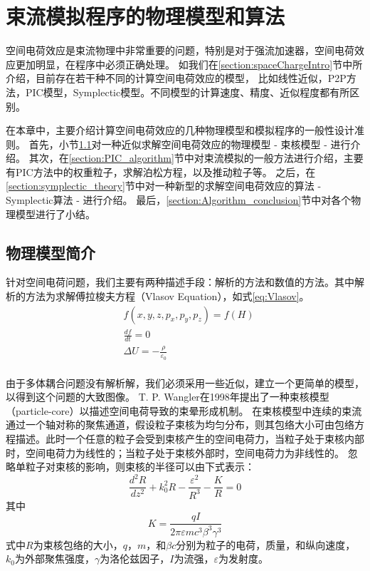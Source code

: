 
\chapter{束流模拟程序的物理模型和算法}
\label{chap:Algorithm}
空间电荷效应是束流物理中非常重要的问题，特别是对于强流加速器，空间电荷效应更加明显，在程序中必须正确处理。
如我们在\ref{section:spaceChargeIntro}节中所介绍，目前存在若干种不同的计算空间电荷效应的模型，
比如线性近似，P2P方法，PIC模型，Symplectic模型。不同模型的计算速度、精度、近似程度都有所区别。

在本章中，主要介绍计算空间电荷效应的几种物理模型和模拟程序的一般性设计准则。
首先，小节\ref{section:particle_core}对一种近似求解空间电荷效应的物理模型 - 束核模型 - 进行介绍。
其次，在\ref{section:PIC_algorithm}节中对束流模拟的一般方法进行介绍，主要有PIC方法中的权重粒子，求解泊松方程，以及推动粒子等。
之后，在\ref{section:symplectic_theory}节中对一种新型的求解空间电荷效应的算法 - Symplectic算法 - 进行介绍。
最后，\ref{section:Algorithm_conclusion}节中对各个物理模型进行了小结。

\section{物理模型简介}            \label{section:particle_core}
针对空间电荷问题，我们主要有两种描述手段：解析的方法和数值的方法。其中解析的方法为求解傅拉梭夫方程（Vlasov Equation），如式\ref{eq:Vlasov}。
\begin{equation}
    \label{eq:Vlasov}
    \begin{aligned}
        & f(x,y,z,{{p}_{x}},{{p}_{y}},{{p}_{z}})=f(H) \\
        & \frac{df}{dt}=0 \\
        & \Delta U=-\frac{\rho }{{{\varepsilon }_{0}}} \\
    \end{aligned}
\end{equation}

由于多体耦合问题没有解析解，我们必须采用一些近似，建立一个更简单的模型，以得到这个问题的大致图像。
T. P. Wangler在1998年提出了一种束核模型（particle-core）\cite{wangler1998particle}以描述空间电荷导致的束晕形成机制。
在束核模型中连续的束流通过一个轴对称的聚焦通道，假设粒子束核为均匀分布，则其包络大小可由包络方程描述。此时一个任意的粒子会受到束核产生的空间电荷力，当粒子处于束核内部时，空间电荷力为线性的；当粒子处于束核外部时，空间电荷力为非线性的。
忽略单粒子对束核的影响，则束核的半径可以由下式表示：
\begin{equation}
    \label{eq:particle_core_envelope}
    \frac{{{d}^{2}}R}{d{{z}^{2}}}+k_{0}^{2}R-\frac{{{\varepsilon }^{2}}}{{{R}^{3}}}-\frac{K}{R}=0
\end{equation}
其中
\begin{equation}
K=\frac{qI}{2\pi \varepsilon m{{c}^{3}}{{\beta }^{3}}{{\gamma }^{3}}}
\end{equation}
式中$R$为束核包络的大小，$q$，$m$，和$\beta c$分别为粒子的电荷，质量，和纵向速度，$k_{0}$为外部聚焦强度，$\gamma$为洛伦兹因子，$I$为流强，$\varepsilon$为发射度。

